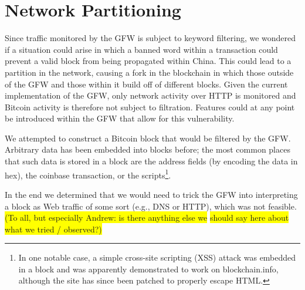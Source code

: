 \section{Network Partitioning}
Since traffic monitored by the GFW is subject to keyword filtering, we wondered if a situation could arise in which a banned word within a transaction could prevent a valid block from being propagated within China. This could lead to a partition in the network, causing a fork in the blockchain in which those outside of the GFW and those within it build off of different blocks. Given the current implementation of the GFW, only network activity over HTTP is monitored and Bitcoin activity is therefore not subject to filtration. Features could at any point be introduced within the GFW that allow for this vulnerability. 

We attempted to construct a Bitcoin block that would be filtered by the GFW. Arbitrary data has been embedded into blocks before; the most common places that such data is stored in a block are the address fields (by encoding the data in hex), the coinbase transaction, or the scripts\footnote{In one notable case, a simple cross-site scripting (XSS) attack was embedded in a block and was apparently demonstrated to work on blockchain.info\cite{reddit}, although the site has since been patched to properly escape HTML.}. 

In the end we determined that we would need to trick the GFW into interpreting a block as Web traffic of some sort (e.g., DNS or HTTP), which was not feasible. \colorbox{yellow}{(To all, but especially Andrew: is there anything else we}
\colorbox{yellow}{should say here about what we tried / observed?)}